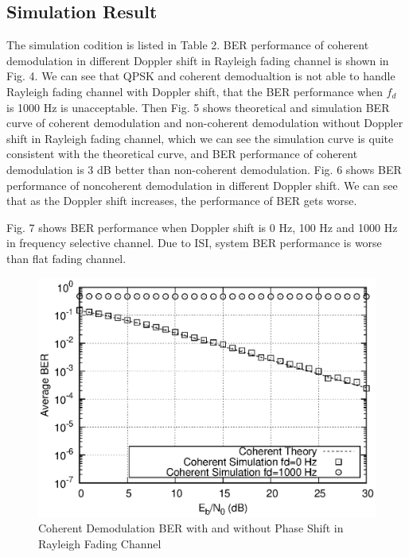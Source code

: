 \documentclass[technicalreport]{ieicej}
\begin{document}
\subsection{Simulation Result}
The simulation codition is listed in Table 2. BER performance of coherent demodulation in different Doppler shift in Rayleigh fading channel is shown in Fig. 4. We can see that QPSK and coherent demodualtion is not able to handle Rayleigh fading channel with Doppler shift, that the BER performance when $f_d$ is 1000 Hz is unacceptable. Then Fig. 5 shows theoretical and simulation BER curve of coherent demodulation and non-coherent demodulation without Doppler shift in Rayleigh fading channel, which we can see the simulation curve is quite consistent with the theoretical curve, and BER performance of coherent demodulation is 3 dB better than non-coherent demodulation. Fig. 6 shows BER performance of noncoherent demodulation in different Doppler shift. We can see that as the Doppler shift increases, the performance of BER gets worse.\par
Fig. 7 shows BER performance when Doppler shift is 0 Hz, 100 Hz and 1000 Hz in frequency selective channel. Due to ISI, system BER performance is worse than flat fading channel.

\begin{figure}[H]
	\begin{center}
		\vspace{0cm}
		\includegraphics[width=\linewidth,clip]{fig/r_coherent.eps}
		\caption{Coherent Demodulation BER with and without Phase Shift in Rayleigh Fading Channel}
		\label{fig:sample}
	\end{center}
\end{figure}
\end{document}
